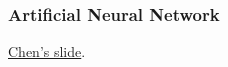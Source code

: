\begin{frame}[fragile]
    \frametitle{Artificial Neural Network}
    \href{https://marcoylyu.github.io/files/ANN.html}{Chen's slide}.
\end{frame}